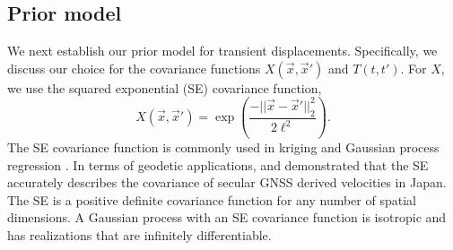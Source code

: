 \documentclass[extra,mreferee]{gji}
\begin{document}
\subsection{Prior model}\label{sec:SignalModel}
We next establish our prior model for transient displacements. Specifically, we discuss our choice for the covariance functions $X(\vec{x},\vec{x}')$ and $T(t,t')$. For $X$, we use the squared exponential (SE) covariance function,
\begin{equation}\label{eq:SE}
X(\vec{x},\vec{x}') = \exp\left(\frac{-||\vec{x} - \vec{x}'||_2^2}{2 \ell^2}\right).
\end{equation}
The SE covariance function is commonly used in kriging \citep[e.g,][]{Cressie1992} and Gaussian process regression \citep[e.g.,][]{Rasmussen2006}. In terms of geodetic applications, \citet{Kato1998} and \cite{El-Fiky1999} demonstrated that the SE accurately describes the covariance of secular GNSS derived velocities in Japan. The SE is a positive definite covariance function for any number of spatial dimensions. A Gaussian process with an SE covariance function is isotropic and has realizations that are infinitely differentiable.      
\end{document}
